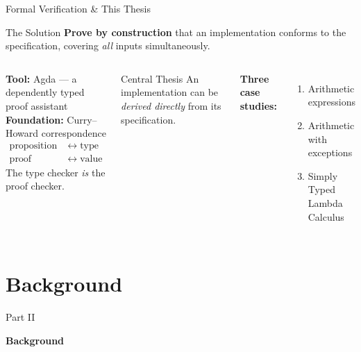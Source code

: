 \documentclass[10pt,compress,aspectratio=169]{beamer}
\begin{document}
\begin{frame}{Formal Verification \& This Thesis}
  \begin{block}{The Solution}
    \textbf{Prove by construction} that an implementation conforms to the specification, covering \emph{all} inputs simultaneously.
  \end{block}
  \bigskip
  \begin{columns}[T]
      \textbf{Tool:} Agda --- a dependently typed proof assistant\\[8pt]
      \textbf{Foundation:} Curry--Howard correspondence
      \begin{align*}
        \text{proposition} &\;\longleftrightarrow\; \text{type}\\
        \text{proof}       &\;\longleftrightarrow\; \text{value}
      \end{align*}
      The type checker \emph{is} the proof checker.
      \begin{block}{Central Thesis}
        An implementation can be \emph{derived directly} from its specification.
      \end{block}
      \bigskip
      \textbf{Three case studies:}
      \begin{enumerate}
        \item Arithmetic expressions
        \item Arithmetic with exceptions
        \item Simply Typed Lambda Calculus
      \end{enumerate}
  \end{columns}
\end{frame}

\section{Background}

\begin{frame}{}
  \centering\vfill
  {Part II\par}
  \bigskip
  {\Large\bfseries Background}
  \vfill
\end{frame}
\end{document}
